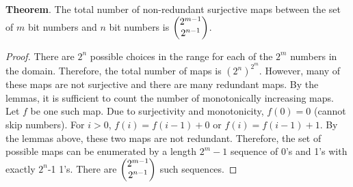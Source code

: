 \documentclass[12pt]{article}
\begin{document}
\vspace{4mm}

\noindent \textbf{Theorem}. The total number of non-redundant surjective maps between the set of $m$ bit numbers and $n$ bit numbers is $\begin{pmatrix}2^{m-1}\cr 2^{n-1}\end{pmatrix}$.

\begin{proof}
There are $2^{n}$ possible choices in the range for each of the $2^m$ numbers in the domain.  Therefore, the total number of maps is $(2^n)^{2^m}$.  However, many of these maps are not surjective and there are many redundant maps.  By the lemmas, it is sufficient to count the number of monotonically increasing maps.  Let $f$ be one such map.  Due to surjectivity and monotonicity, $f(0)=0$ (cannot skip numbers).  For $i>0$, $f(i)=f(i-1)+0$ or $f(i)=f(i-1)+1$.  By the lemmas above, these two maps are not redundant.  Therefore, the set of possible maps can be enumerated by a length $2^m-1$ sequence of 0's and 1's with exactly $2^n$-1 1's.  There are $\begin{pmatrix}2^{m-1}\cr 2^{n-1}\end{pmatrix}$ such sequences.
\end{proof}

\clearpage

%

{}
\end{document}
